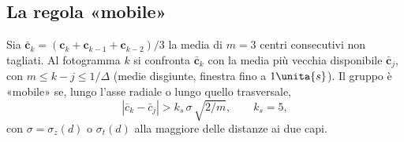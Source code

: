\subsection{La regola «mobile»}\label{sec:sti-mobile}

\begin{definizione}\label{def:sti-mobile}
Sia $\bar{\mathbf c}_k=(\mathbf c_k+\mathbf c_{k-1}+\mathbf c_{k-2})/3$ la media di $m=3$ centri consecutivi non tagliati. Al fotogramma $k$ si confronta $\bar{\mathbf c}_k$ con la media più vecchia disponibile $\bar{\mathbf c}_j$, con $m\le k-j\le1/\Delta$ (medie disgiunte, finestra fino a $1\unita{s}$). Il gruppo è «mobile» se, lungo l'asse radiale o lungo quello trasversale,
\begin{equation}\label{eq:sti-soglia}
|\bar c_k-\bar c_j|>k_s\,\sigma\,\sqrt{2/m},\qquad k_s=5,
\end{equation}
con $\sigma=\sigma_z(d)$ o $\sigma_t(d)$ alla maggiore delle distanze ai due capi.
\end{definizione}

